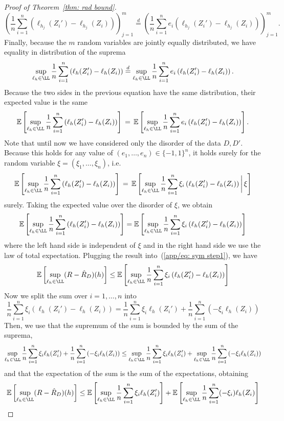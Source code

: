 \documentclass[reqno]{amsart}
\begin{document}
\begin{theorem}
\begin{proof}[Proof of Theorem~\ref{thm: rad bound}]
\[
\left(\frac1n\sum_{i=1}^n \left(\ell_{h_j}(Z_i')-\ell_{h_j}(Z_i)\right)\right)_{j=1}^m \overset{d}{=} \left(\frac1n\sum_{i=1}^n e_i\left(\ell_{h_j}(Z_i')-\ell_{h_j}(Z_i)\right)\right)_{j=1}^m.
\]
Finally, because the $m$ random variables are jointly equally distributed, we have equality in distribution of the suprema
\[
\sup_{\ell_h\in\LL}\frac1n\sum_{i=1}^n \left(\ell_h(Z_i')-\ell_h(Z_i)\right) \overset{d}{=} \sup_{\ell_h\in\LL}\frac1n\sum_{i=1}^n e_i\left(\ell_h(Z_i')-\ell_h(Z_i)\right).
\]
Because the two sides in the previous equation have the same distribution, their expected value is the same
\[
\expv\left[\sup_{\ell_h\in\LL}\frac1n\sum_{i=1}^n \left(\ell_h(Z_i')-\ell_h(Z_i)\right)\right]\, = \,\expv\left[\sup_{\ell_h\in\LL}\frac1n\sum_{i=1}^n e_i\left(\ell_h(Z_i')-\ell_h(Z_i)\right)\right].
\]
Note that until now we have considered only the disorder of the data $D,D'$. Because this holds for any value of $(e_1,\ldots,e_n)\in\{-1,1\}^n$, it holds surely for the random variable $\xi = (\xi_1,\ldots,\xi_n)$, i.e.\ 
\[
\expv\left[\sup_{\ell_h\in\LL}\frac1n\sum_{i=1}^n \left(\ell_h(Z_i')-\ell_h(Z_i)\right)\right]\, = \,\expv\left[\sup_{\ell_h\in\LL}\frac1n\sum_{i=1}^n \xi_i\left(\ell_h(Z_i')-\ell_h(Z_i)\right)\bigg\vert\, \xi\right]
\]
surely. Taking the expected value over the disorder of $\xi$, we obtain
\[
\expv\left[\sup_{\ell_h\in\LL}\frac1n\sum_{i=1}^n \left(\ell_h(Z_i')-\ell_h(Z_i)\right)\right] = \expv\left[\sup_{\ell_h\in\LL}\frac1n\sum_{i=1}^n \xi_i\left(\ell_h(Z_i')-\ell_h(Z_i)\right)\right]
\]
where the left hand side is independent of $\xi$ and in the right hand side we use the law of total expectation. 
Plugging the result into~(\ref{app/eq: sym step1}), we have 
\[
\expv\left[\sup_{\ell_h\in\LL}(R-\hat R_D)(h)\right] \le\expv\left[\sup_{\ell_h\in\LL}\frac1n\sum_{i=1}^n \xi_i\left(\ell_h(Z_i')-\ell_h(Z_i)\right)\right]
\]
Now we split the sum over $i=1,\ldots,n$ into
\[
\frac1n\sum_{i=1}^n \xi_i\left(\ell_h(Z_i')-\ell_h(Z_i)\right) = \frac1n\sum_{i=1}^n \xi_i\ell_h(Z_i') + \frac1n\sum_{i=1}^n\left(-\xi_i\ell_h(Z_i)\right)
\]
Then, we use that the supremum of the sum is bounded by the sum of the suprema, 
\[
\sup_{\ell_h\in\LL} \frac1n\sum_{i=1}^n \xi_i\ell_h(Z_i') + \frac1n\sum_{i=1}^n\left(-\xi_i\ell_h(Z_i)\right) \le \sup_{\ell_h\in\LL} \frac1n\sum_{i=1}^n \xi_i\ell_h(Z_i') + \sup_{\ell_h\in\LL}\frac1n\sum_{i=1}^n\left(-\xi_i\ell_h(Z_i)\right)
\]
and that the expectation of the sum is the sum of the expectations, obtaining
\[
\expv\left[\sup_{\ell_h\in\LL}(R-\hat R_D)(h)\right] \le\expv\left[\sup_{\ell_h\in\LL}\frac1n\sum_{i=1}^n \xi_i\ell_h(Z_i')\right] + \expv\left[\sup_{\ell_h\in\LL}\frac1n\sum_{i=1}^n (-\xi_i)\ell_h(Z_i)\right]
\]
\end{proof}
\end{theorem}
\end{document}
